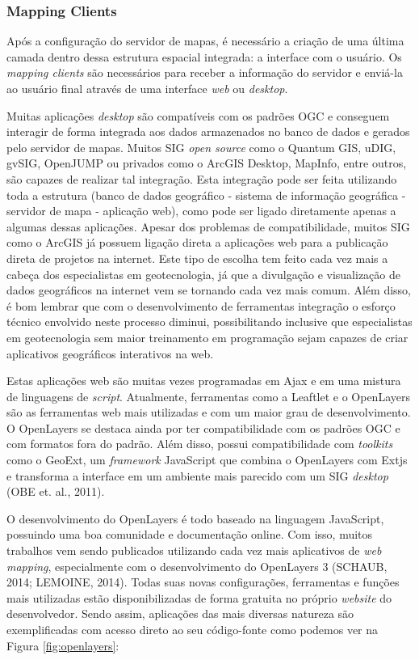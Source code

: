 		\subsubsection{Mapping Clients}
		
		Após a configuração do servidor de mapas, é necessário a criação de uma última camada dentro dessa estrutura espacial integrada: a interface com o usuário. Os \textit{mapping clients} são necessários para receber a informação do servidor e enviá-la ao usuário final através de uma interface \textit{web} ou \textit{desktop}.
		
		Muitas aplicações \textit{desktop} são compatíveis com os padrões OGC e conseguem interagir de forma integrada aos dados armazenados no banco de dados e gerados pelo servidor de mapas. Muitos SIG \textit{open source} como o Quantum GIS, uDIG, gvSIG, OpenJUMP ou privados como o ArcGIS Desktop, MapInfo, entre outros, são capazes de realizar tal integração. Esta integração pode ser feita utilizando toda a estrutura (banco de dados geográfico - sistema de informação geográfica - servidor de mapa - aplicação web), como pode ser ligado diretamente apenas a algumas dessas aplicações. Apesar dos problemas de compatibilidade, muitos SIG como o ArcGIS já possuem ligação direta a aplicações web para a publicação direta de projetos na internet. Este tipo de escolha tem feito cada vez mais a cabeça dos especialistas em geotecnologia, já que a divulgação e visualização de dados geográficos na internet vem se tornando cada vez mais comum. Além disso, é bom lembrar que com o desenvolvimento de ferramentas integração o esforço técnico envolvido neste processo diminui, possibilitando inclusive que especialistas em geotecnologia sem maior treinamento em programação sejam capazes de criar aplicativos geográficos interativos na web.
		
		Estas aplicações web são muitas vezes programadas em Ajax e em uma mistura de linguagens de \textit{script}. Atualmente, ferramentas como a Leaftlet e o OpenLayers são as ferramentas web mais utilizadas e com um maior grau de desenvolvimento. O OpenLayers se destaca ainda por ter compatibilidade com os padrões OGC e com formatos fora do padrão. Além disso, possui compatibilidade com \textit{toolkits} como o GeoExt, um \textit{framework} JavaScript que combina o OpenLayers com Extjs  e transforma a interface em um ambiente mais parecido com um SIG \textit{desktop} (OBE et. al., 2011)\cite{OBE_etal11}.
		
		O desenvolvimento do OpenLayers é todo baseado na linguagem JavaScript, possuindo uma boa comunidade e documentação online. Com isso, muitos trabalhos vem sendo publicados utilizando cada vez mais aplicativos de \textit{web mapping}, especialmente com o desenvolvimento do OpenLayers 3 (SCHAUB, 2014\cite{SCHAUB}; LEMOINE, 2014\cite{LEMOINE}). Todas suas novas configurações, ferramentas e funções mais utilizadas estão disponibilizadas de forma gratuita no próprio \textit{website} do desenvolvedor. Sendo assim, aplicações das mais diversas natureza são exemplificadas com acesso direto ao seu código-fonte como podemos ver na Figura \ref{fig:openlayers}: 
		
